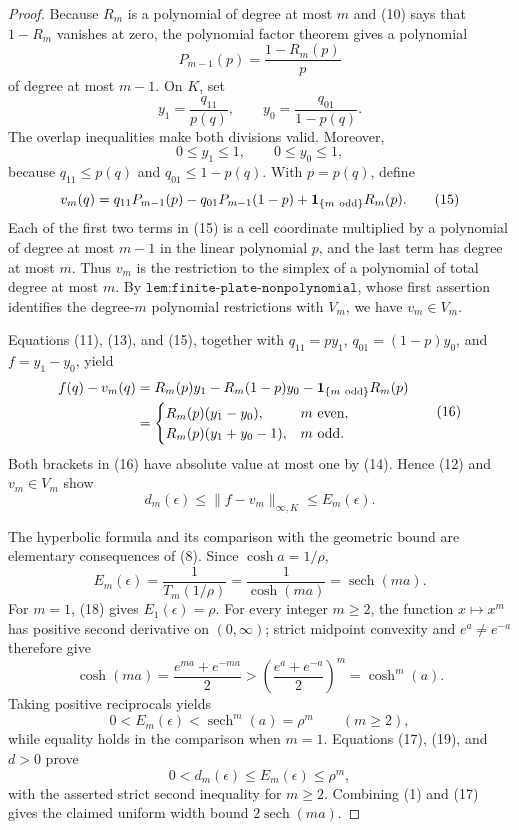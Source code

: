 \documentclass{article}
\begin{document}
\begin{proof}
Because \(R_m\) is a polynomial of degree at most \(m\) and (10) says that \(1-R_m\) vanishes at zero, the polynomial factor theorem gives a polynomial
\[
 P_{m-1}(p)=\frac{1-R_m(p)}{p} \tag{13}
\]
of degree at most \(m-1\).  On \(K\), set
\[
 y_1=\frac{q_{11}}{p(q)},
 \qquad
 y_0=\frac{q_{01}}{1-p(q)}.
\]
The overlap inequalities make both divisions valid.  Moreover,
\[
 0\leq y_1\leq1,
 \qquad
 0\leq y_0\leq1, \tag{14}
\]
because \(q_{11}\leq p(q)\) and \(q_{01}\leq1-p(q)\).  With \(p=p(q)\), define
\[
 v_m(q)=q_{11}P_{m-1}(p)-q_{01}P_{m-1}(1-p)
 +\mathbf 1_{\{m\ {\rm odd}\}}R_m(p). \tag{15}
\]
Each of the first two terms in (15) is a cell coordinate multiplied by a polynomial of degree at most \(m-1\) in the linear polynomial \(p\), and the last term has degree at most \(m\).  Thus \(v_m\) is the restriction to the simplex of a polynomial of total degree at most \(m\).  By \(\texttt{lem:finite-plate-nonpolynomial}\), whose first assertion identifies the degree-\(m\) polynomial restrictions with \(V_m\), we have \(v_m\in V_m\).

Equations (11), (13), and (15), together with \(q_{11}=py_1\), \(q_{01}=(1-p)y_0\), and \(f=y_1-y_0\), yield
\[
\begin{aligned}
 f(q)-v_m(q)
 &=R_m(p)y_1-R_m(1-p)y_0
   -\mathbf 1_{\{m\ {\rm odd}\}}R_m(p)\\
 &=
 \begin{cases}
 R_m(p)(y_1-y_0),&m\text{ even},\\
 R_m(p)(y_1+y_0-1),&m\text{ odd}.
 \end{cases}
\end{aligned} \tag{16}
\]
Both brackets in (16) have absolute value at most one by (14).  Hence (12) and \(v_m\in V_m\) show
\[
 d_m(\epsilon)
 \leq\lVert f-v_m\rVert_{\infty,K}
 \leq E_m(\epsilon). \tag{17}
\]

The hyperbolic formula and its comparison with the geometric bound are elementary consequences of (8).  Since \(\cosh a=1/\rho\),
\[
 E_m(\epsilon)=\frac{1}{T_m(1/\rho)}
 =\frac{1}{\cosh(ma)}=\operatorname{sech}(ma). \tag{18}
\]
For \(m=1\), (18) gives \(E_1(\epsilon)=\rho\).  For every integer \(m\geq2\), the function \(x\mapsto x^m\) has positive second derivative on \((0,\infty)\); strict midpoint convexity and \(e^a\ne e^{-a}\) therefore give
\[
 \cosh(ma)=\frac{e^{ma}+e^{-ma}}{2}
 >\left(\frac{e^a+e^{-a}}{2}\right)^m
 =\cosh^m(a).
\]
Taking positive reciprocals yields
\[
 0<E_m(\epsilon)<\operatorname{sech}^m(a)=\rho^m
 \qquad(m\geq2), \tag{19}
\]
while equality holds in the comparison when \(m=1\).  Equations (17), (19), and \(d>0\) prove
\[
 0<d_m(\epsilon)\leq E_m(\epsilon)\leq\rho^m,
\]
with the asserted strict second inequality for \(m\geq2\).  Combining (1) and (17) gives the claimed uniform width bound \(2\operatorname{sech}(ma)\).


\end{proof}
\end{document}
